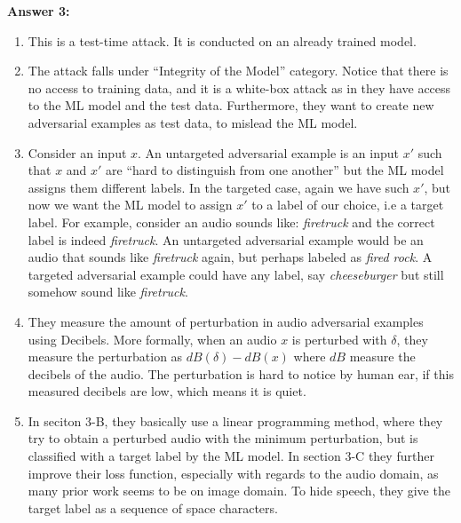 \documentclass[12pt,reqno]{amsart}
\begin{document}
\textbf{Answer 3:}
\begin{enumerate}[label=(\alph*)]
\item This is a test-time attack. It is conducted on an already trained model.

\item The attack falls under ``Integrity of the Model'' category. Notice that there is no access to training data, and it is a white-box attack as in they have access to the ML model and the test data. Furthermore, they want to create new adversarial examples as test data, to mislead the ML model. 

\item Consider an input $x$. An untargeted adversarial example is an input $x'$ such that $x$ and $x'$ are ``hard to distinguish from one another'' but the ML model assigns them different labels. In the targeted case, again we have such $x'$, but now we want the ML model to assign $x'$ to a label of our choice, i.e a target label. For example, consider an audio sounds like: \textit{firetruck} and the correct label is indeed \textit{firetruck}. An untargeted adversarial example would be an audio that sounds like \textit{firetruck} again, but perhaps labeled as \textit{fired rock}. A targeted adversarial example could have any label, say \textit{cheeseburger} but still somehow sound like \textit{firetruck}.

\item They measure the amount of perturbation in audio adversarial examples using Decibels. More formally, when an audio $x$ is perturbed with $\delta$, they measure the perturbation as $dB(\delta)-dB(x)$ where $dB$ measure the decibels of the audio. The perturbation is hard to notice by human ear, if this measured decibels are low, which means it is quiet.

\item In seciton 3-B, they basically use a linear programming method, where they try to obtain a perturbed audio with the minimum perturbation, but is classified with a target label by the ML model. In section 3-C they further improve their loss function, especially with regards to the audio domain, as many prior work seems to be on image domain. To hide speech, they give the target label as a sequence of space characters.


\end{enumerate}
\end{document}
